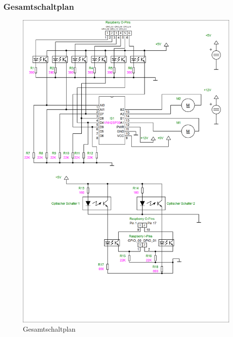 \subsubsection{Gesamtschaltplan}
\begin{figure}[H] 
\begin{center}

\includegraphics[width=15cm]{Bilder/Schaltplan/Gesamtschaltplan}
\caption{Gesamtschaltplan}
\label{Gesamtschaltplan}

\end{center}
\end{figure}
